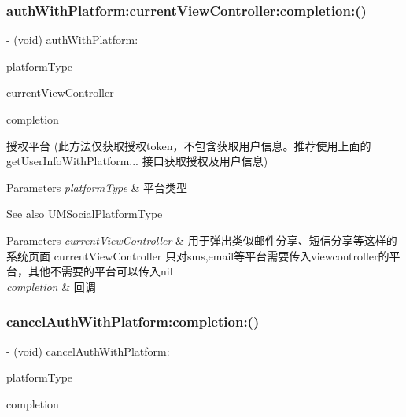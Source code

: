 \subsubsection{\texorpdfstring{auth\+With\+Platform\+:current\+View\+Controller\+:completion\+:()}{authWithPlatform:currentViewController:completion:()}\hspace{0.1cm}{\footnotesize\ttfamily [2/2]}}
{\footnotesize\ttfamily -\/ (void) auth\+With\+Platform\+: \begin{DoxyParamCaption}\item[{(U\+M\+Social\+Platform\+Type)}]{platform\+Type }\item[{currentViewController:(U\+I\+View\+Controller $\ast$)}]{current\+View\+Controller }\item[{completion:(U\+M\+Social\+Request\+Completion\+Handler)}]{completion }\end{DoxyParamCaption}}

授权平台 (此方法仅获取授权token，不包含获取用户信息。推荐使用上面的 get\+User\+Info\+With\+Platform... 接口获取授权及用户信息)


\begin{DoxyParams}{Parameters}
{\em platform\+Type} & 平台类型 \\
\hline
\end{DoxyParams}
\begin{DoxySeeAlso}{See also}
U\+M\+Social\+Platform\+Type 
\end{DoxySeeAlso}

\begin{DoxyParams}{Parameters}
{\em current\+View\+Controller} & 用于弹出类似邮件分享、短信分享等这样的系统页面  current\+View\+Controller 只对sms,email等平台需要传入viewcontroller的平台，其他不需要的平台可以传入nil \\
\hline
{\em completion} & 回调 \\
\hline
\end{DoxyParams}
\mbox{\label{interface_u_m_social_manager_af4981d741af306f9eff64b4bd3319f47}} 
\subsubsection{\texorpdfstring{cancel\+Auth\+With\+Platform\+:completion\+:()}{cancelAuthWithPlatform:completion:()}\hspace{0.1cm}{\footnotesize\ttfamily [1/2]}}
{\footnotesize\ttfamily -\/ (void) cancel\+Auth\+With\+Platform\+: \begin{DoxyParamCaption}\item[{(U\+M\+Social\+Platform\+Type)}]{platform\+Type }\item[{completion:(U\+M\+Social\+Request\+Completion\+Handler)}]{completion }\end{DoxyParamCaption}}


